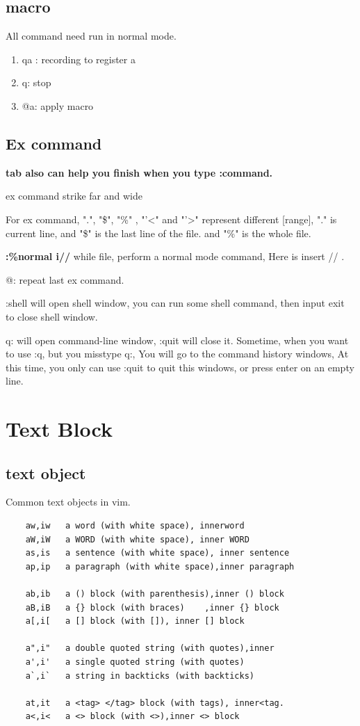 \documentclass[paper=8.5in:11in, twoside, 12pt, pagesize=pdftex]{book}
\begin{document}
\subsection{macro}
All command need run in normal mode.
\begin{enumerate}
	\item qa : recording to register a
	\item q:  stop
	\item @a: apply macro
\end{enumerate}

\subsection{Ex command}

	\textbf{tab also can help you finish when you type :command.}
		
		ex command strike far and wide
		
		For ex command, ".", "\$", "\%" , "'<"  and "'>" represent different [range], "." is current line, and "\$" is the last line of the file. and "\%" is the whole file.
		
		\textbf{:\%normal i//} while file, perform a normal mode command, Here is insert // . 
		
		 @: repeat last ex command.
		
		:shell will open shell window, you can run some shell command, then input exit to close shell window. 
		
		q: will open command-line window, :quit will close it. Sometime, when you want to use :q, but you misstype q:, You will go to the command history windows, At this time, you only can use :quit to quit this windows, or press enter on an empty line.
		
\section{Text Block}

\subsection{text object}
Common text objects in vim. 
\begin{verbatim}
	aw,iw	a word (with white space), innerword		
	aW,iW	a WORD (with white space), inner WORD		
	as,is	a sentence (with white space), inner sentence
	ap,ip	a paragraph (with white space),inner paragraph
	
	ab,ib	a () block (with parenthesis),inner () block
	aB,iB	a {} block (with braces)	,inner {} block
	a[,i[	a [] block (with []), inner [] block
	
	a",i"	a double quoted string (with quotes),inner
	a',i'	a single quoted string (with quotes)
	a`,i`	a string in backticks (with backticks)
	
	at,it	a <tag> </tag> block (with tags), inner<tag.
	a<,i<	a <> block (with <>),inner <> block
\end{verbatim}
\end{document}

